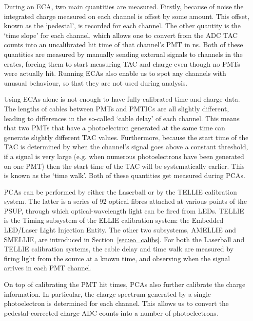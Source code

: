 During an ECA, two main quantities are measured. Firstly, because of noise the integrated charge measured on each channel is offset by some amount. This offset, known as the `pedestal', is recorded for each channel. The other quantity is the `time slope' for each channel, which allows one to convert from the ADC TAC counts into an uncalibrated hit time of that channel's PMT in \si{\ns}. Both of these quantities are measured by manually sending external signals to channels in the crates, forcing them to start measuring TAC and charge even though no PMTs were actually hit. Running ECAs also enable us to spot any channels with unusual behaviour, so that they are not used during analysis.

Using ECAs alone is not enough to have fully-calibrated time and charge data. The lengths of cables between PMTs and PMTICs are all slightly different, leading to differences in the so-called `cable delay' of each channel. This means that two PMTs that have a photoelectron generated at the same time can generate slightly different TAC values. Furthermore, because the start time of the TAC is determined by when the channel's signal goes above a constant threshold, if a signal is very large (e.g. when numerous photoelectrons have been generated on one PMT) then the start time of the TAC will be systematically earlier. This is known as the `time walk'. Both of these quantities get measured during PCAs.

PCAs can be performed by either the Laserball or by the TELLIE calibration system. The latter is a series of 92 optical fibres attached at various points of the PSUP, through which optical-wavelength light can be fired from LEDs. TELLIE is the Timing subsystem of the ELLIE calibration system: the Embedded LED/Laser Light Injection Entity. The other two subsystems, AMELLIE and SMELLIE, are introduced in Section~\ref{sec:eo_calibs}. For both the Laserball and TELLIE calibration systems, the cable delay and time walk are measured by firing light from the source at a known time, and observing when the signal arrives in each PMT channel.

On top of calibrating the PMT hit times, PCAs also further calibrate the charge information. In particular, the charge spectrum generated by a single photoelectron is determined for each channel. This allows us to convert the pedestal-corrected charge ADC counts into a number of photoelectrons.

